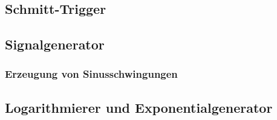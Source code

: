 \subsection{Schmitt-Trigger}
\label{subsec:schmitt_trigger}

\subsection{Signalgenerator}
\label{subsec:signalgenerator}

\subsubsection{Erzeugung von Sinusschwingungen}
\label{subsubsec:sinusschwingungen}

\subsection{Logarithmierer und Exponentialgenerator}
\label{subsec:log_expo}
